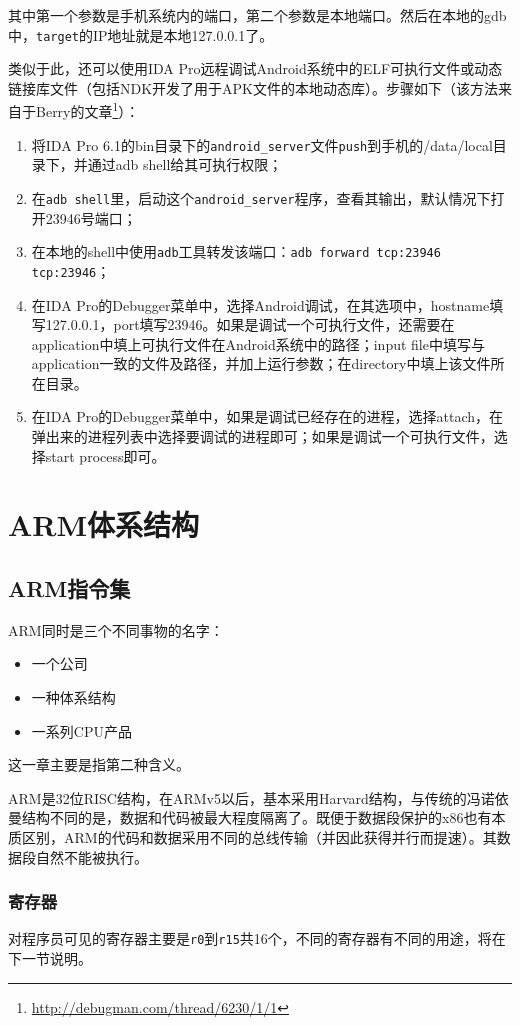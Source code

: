 其中第一个参数是手机系统内的端口，第二个参数是本地端口。然后在本地的gdb中，\lstinline!target!的IP地址就是本地127.0.0.1了。

类似于此，还可以使用IDA Pro远程调试Android系统中的ELF可执行文件或动态链接库文件（包括NDK开发了用于APK文件的本地动态库）。步骤如下（该方法来自于Berry的文章\footnote{\url{http://debugman.com/thread/6230/1/1}}）：

\begin{enumerate}
  \item 将IDA Pro 6.1的bin目录下的\lstinline!android_server!文件\lstinline!push!到手机的/data/local目录下，并通过adb shell给其可执行权限；
  \item 在\lstinline!adb shell!里，启动这个\lstinline!android_server!程序，查看其输出，默认情况下打开23946号端口；
  \item 在本地的shell中使用\lstinline!adb!工具转发该端口：\lstinline!adb forward tcp:23946 tcp:23946!；
  \item 在IDA Pro的Debugger菜单中，选择Android调试，在其选项中，hostname填写127.0.0.1，port填写23946。如果是调试一个可执行文件，还需要在application中填上可执行文件在Android系统中的路径；input file中填写与application一致的文件及路径，并加上运行参数；在directory中填上该文件所在目录。
  \item 在IDA Pro的Debugger菜单中，如果是调试已经存在的进程，选择attach，在弹出来的进程列表中选择要调试的进程即可；如果是调试一个可执行文件，选择start process即可。
\end{enumerate}

\section{ARM体系结构}
\subsection{ARM指令集}
ARM同时是三个不同事物的名字：
\begin{itemize}
\item 一个公司
\item 一种体系结构
\item 一系列CPU产品
\end{itemize}
这一章主要是指第二种含义。

ARM是32位RISC结构，在ARMv5以后，基本采用Harvard结构，与传统的冯诺依曼结构不同的是，数据和代码被最大程度隔离了。既便于数据段保护的x86也有本质区别，ARM的代码和数据采用不同的总线传输（并因此获得并行而提速）。其数据段自然不能被执行。

\subsubsection{寄存器}
对程序员可见的寄存器主要是\lstinline!r0!到\lstinline!r15!共16个，不同的寄存器有不同的用途，将在下一节说明。

